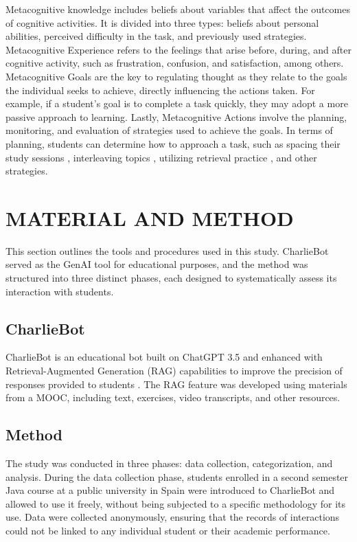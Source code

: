 \documentclass[a4paper,twoside]{article}
\begin{document}
Metacognitive knowledge includes beliefs about variables that affect the
outcomes of cognitive activities. It is divided into three types: beliefs about
personal abilities, perceived difficulty in the task, and previously used
strategies. Metacognitive Experience refers to the feelings that arise
before, during, and after cognitive activity, such as frustration, confusion,
and satisfaction, among others. Metacognitive Goals are the key to regulating
thought as they relate to the goals the individual seeks to achieve, directly
influencing the actions taken. For example, if a student’s goal is to complete
a task quickly, they may adopt a more passive approach to learning. Lastly,
Metacognitive Actions involve the planning, monitoring, and evaluation of
strategies used to achieve the goals. In terms of planning, students can
determine how to approach a task, such as spacing their study sessions
\citep{Ouhao18, Carvalho20}, interleaving topics \citep{Rivers21}, utilizing
retrieval practice \citep{larsen18}, and other strategies.

\section{\uppercase{Material and Method}}

This section outlines the tools and procedures used in this study. CharlieBot
served as the GenAI tool for educational purposes, and the method was structured
into three distinct phases, each designed to systematically assess its
interaction with students.

\subsection{CharlieBot}

CharlieBot is an educational bot built on ChatGPT 3.5 and enhanced with
Retrieval-Augmented Generation (RAG) capabilities to improve the precision of
responses provided to students \cite{Sun24}. The RAG feature was developed using
materials from a MOOC, including text, exercises, video transcripts, and other
resources.

\subsection{Method}

The study was conducted in three phases: data collection,
categorization, and analysis. During the data collection phase, students
enrolled in a second semester Java course at a public university in Spain were
introduced to CharlieBot and allowed to use it freely, without being subjected
to a specific methodology for its use. Data were collected anonymously, ensuring
that the records of interactions could not be linked to any individual student
or their academic performance.
\end{document}
